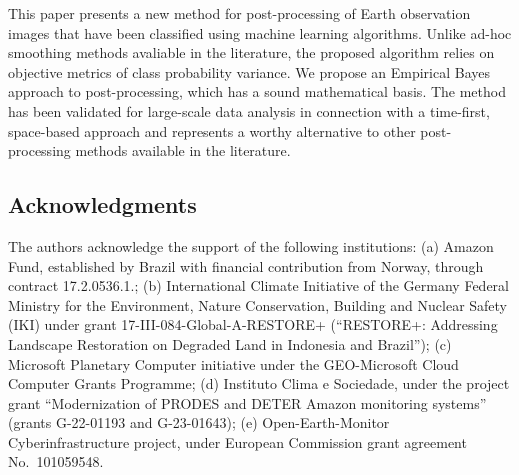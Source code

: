 \documentclass[
  shortnames]{jss}
\begin{document}
This paper presents a new method for post-processing of Earth observation images that have been classified using machine learning algorithms. Unlike ad-hoc smoothing methods avaliable in the literature, the proposed algorithm relies on objective metrics of class probability variance. We propose an Empirical Bayes approach to post-processing, which has a sound mathematical basis. The method has been validated for large-scale data analysis in connection with a time-first, space-based approach and represents a worthy alternative to other post-processing methods available in the literature.

\subsection*{Acknowledgments}\label{acknowledgments}

The authors acknowledge the support of the following institutions: (a) Amazon Fund, established by Brazil with financial contribution from Norway, through contract 17.2.0536.1.; (b) International Climate Initiative of the Germany Federal Ministry for the Environment, Nature Conservation, Building and Nuclear Safety (IKI) under grant 17-III-084-Global-A-RESTORE+ (``RESTORE+: Addressing Landscape Restoration on Degraded Land in Indonesia and Brazil''); (c) Microsoft Planetary Computer initiative under the GEO-Microsoft Cloud Computer Grants Programme; (d) Instituto Clima e Sociedade, under the project grant ``Modernization of PRODES and DETER Amazon monitoring systems'' (grants G-22-01193 and G-23-01643); (e) Open-Earth-Monitor Cyberinfrastructure project, under European Commission grant agreement No.~101059548.


\end{document}
